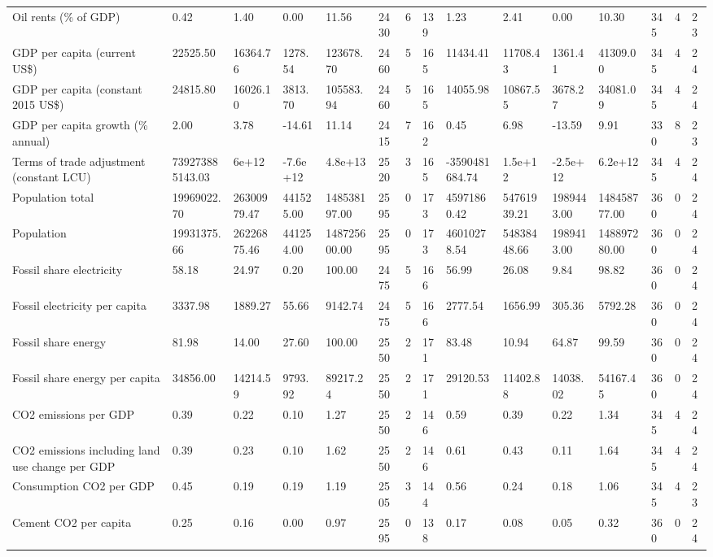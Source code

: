 \begin{longtable}{lllllllllllllll}
Oil rents (\% of GDP) & 0.42 & 1.40 & 0.00 & 11.56 & 2430 & 6 & 139 & 1.23 & 2.41 & 0.00 & 10.30 & 345 & 4 & 23\\
GDP per capita (current US\$) & 22525.50 & 16364.76 & 1278.54 & 123678.70 & 2460 & 5 & 165 & 11434.41 & 11708.43 & 1361.41 & 41309.00 & 345 & 4 & 24\\
GDP per capita (constant 2015 US\$) & 24815.80 & 16026.10 & 3813.70 & 105583.94 & 2460 & 5 & 165 & 14055.98 & 10867.55 & 3678.27 & 34081.09 & 345 & 4 & 24\\
\addlinespace
GDP per capita growth (\% annual) & 2.00 & 3.78 & -14.61 & 11.14 & 2415 & 7 & 162 & 0.45 & 6.98 & -13.59 & 9.91 & 330 & 8 & 23\\
Terms of trade adjustment (constant LCU) & 739273885143.03 & 6e+12 & -7.6e+12 & 4.8e+13 & 2520 & 3 & 165 & -3590481684.74 & 1.5e+12 & -2.5e+12 & 6.2e+12 & 345 & 4 & 24\\
Population total & 19969022.70 & 26300979.47 & 441525.00 & 148538197.00 & 2595 & 0 & 173 & 45971860.42 & 54761939.21 & 1989443.00 & 148458777.00 & 360 & 0 & 24\\
Population & 19931375.66 & 26226875.46 & 441254.00 & 148725600.00 & 2595 & 0 & 173 & 46010278.54 & 54838448.66 & 1989413.00 & 148897280.00 & 360 & 0 & 24\\
Fossil share electricity & 58.18 & 24.97 & 0.20 & 100.00 & 2475 & 5 & 166 & 56.99 & 26.08 & 9.84 & 98.82 & 360 & 0 & 24\\
\addlinespace
Fossil electricity per capita & 3337.98 & 1889.27 & 55.66 & 9142.74 & 2475 & 5 & 166 & 2777.54 & 1656.99 & 305.36 & 5792.28 & 360 & 0 & 24\\
Fossil share energy & 81.98 & 14.00 & 27.60 & 100.00 & 2550 & 2 & 171 & 83.48 & 10.94 & 64.87 & 99.59 & 360 & 0 & 24\\
Fossil share energy per capita & 34856.00 & 14214.59 & 9793.92 & 89217.24 & 2550 & 2 & 171 & 29120.53 & 11402.88 & 14038.02 & 54167.45 & 360 & 0 & 24\\
CO2 emissions per GDP & 0.39 & 0.22 & 0.10 & 1.27 & 2550 & 2 & 146 & 0.59 & 0.39 & 0.22 & 1.34 & 345 & 4 & 24\\
CO2 emissions including land use change per GDP & 0.39 & 0.23 & 0.10 & 1.62 & 2550 & 2 & 146 & 0.61 & 0.43 & 0.11 & 1.64 & 345 & 4 & 24\\
\addlinespace
Consumption CO2 per GDP & 0.45 & 0.19 & 0.19 & 1.19 & 2505 & 3 & 144 & 0.56 & 0.24 & 0.18 & 1.06 & 345 & 4 & 23\\
Cement CO2 per capita & 0.25 & 0.16 & 0.00 & 0.97 & 2595 & 0 & 138 & 0.17 & 0.08 & 0.05 & 0.32 & 360 & 0 & 24\\

\end{longtable}
